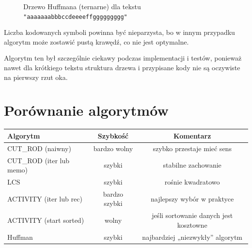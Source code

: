 \documentclass[a4paper,12pt]{article}
\begin{document}
\begin{figure}[H]
\centering
{}
\caption{Drzewo Huffmana (ternarne) dla tekstu \texttt{"aaaaaaabbbccdeeeeffggggggggg"}}
\end{figure}

Liczba kodowanych symboli powinna być nieparzysta, bo w innym przypadku algorytm może zostawić
pustą krawędź, co nie jest optymalne.

Algorytm ten był szczególnie ciekawy podczas implementacji i testów,
ponieważ nawet dla krótkiego tekstu struktura drzewa i przypisane kody
nie są oczywiste na pierwszy rzut oka.

\section{Porównanie algorytmów}

\begin{center}
\begin{tabular}{|>{\raggedright}p{4cm}|c|c|}
\hline
\textbf{Algorytm} & \textbf{Szybkość} & \textbf{Komentarz} \\
\hline
CUT\_ROD (naiwny) & bardzo wolny & szybko przestaje mieć sens \\
\hline
CUT\_ROD (iter lub memo) & szybki  & stabilne zachowanie \\
\hline
LCS & szybki & rośnie kwadratowo \\
\hline
ACTIVITY (iter lub rec) & bardzo szybki & najlepszy wybór w praktyce \\
\hline
ACTIVITY (start sorted) & wolny  &jeśli sortowanie danych jest kosztowne\\
\hline
Huffman & szybki  & najbardziej „niezwykły” algorytm \\
\hline
\end{tabular}
\end{center}
\end{document}
